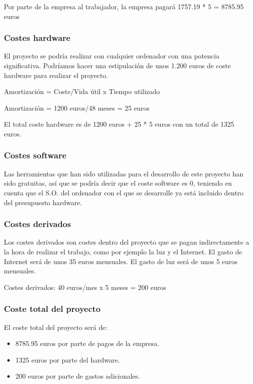 Por parte de la empresa al trabajador, la empresa pagará 1757.19 * 5 = 8785.95 euros



\subsubsection{Costes hardware}
El proyecto se podría realizar con cualquier ordenador con una potencia significativa.
Podríamos hacer una estipulación de unos 1.200 euros de coste hardware para realizar el proyecto.

Amortización = Coste/Vida útil x Tiempo utilizado

Amortización = 1200 euros/48 meses = 25 euros

El total coste hardware es de 1200 euros + 25 * 5 euros con un total de 1325 euros.

\subsubsection{Costes software}
Las herramientas que han sido utilizadas para el desarrollo de este proyecto han sido gratuitas, así que se podría decir que el coste software es 0, teniendo en cuenta que el S.O. del ordenador con el que se desarrolle ya está incluido dentro del presupuesto hardware.

\subsubsection{Costes derivados}
Los costes derivados son costes dentro del proyecto que se pagan indirectamente a la hora de realizar el trabajo, como por ejemplo la luz y el Internet.
El gasto de Internet será de unos 35 euros mensuales.
El gasto de luz será de unos 5 euros mensuales.

Costes derivados: 
40 euros/mes x 5 meses = 200 euros

\subsubsection{Coste total del proyecto}

El coste total del proyecto será de:

\begin{itemize}
	\item 8785.95 euros por parte de pagos de la empresa.
	\item 1325 euros por parte del hardware.
	\item 200 euros por parte de gastos adicionales.
\end{itemize}


